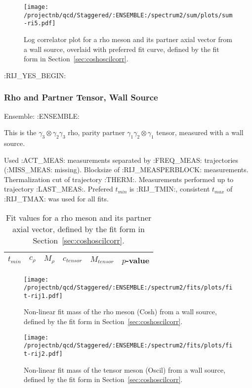 \begin{figure}[H]
\centering
\texttt{[image: /projectnb/qcd/Staggered/:ENSEMBLE:/spectrum2/sum/plots/sum-ri5.pdf]}
\caption{Log correlator plot for a rho meson and its partner axial vector from a wall source, overlaid with preferred fit curve, defined by the fit form in Section~\ref{sec:coshoscilcorr}.}
\end{figure}

\clearpage

:RIJ_YES_BEGIN:
\subsubsection{Rho and Partner Tensor, Wall Source}

Ensemble: :ENSEMBLE:

This is the $\gamma_3 \otimes \gamma_2 \gamma_3$ rho, parity partner $\gamma_1 \gamma_2 \otimes \gamma_1$ tensor, measured with a wall source.

{\small{Used :ACT_MEAS: measurements separated by :FREQ_MEAS: trajectories (:MISS_MEAS: missing). Blocksize of :RIJ_MEASPERBLOCK: measurements. Thermalization cut of trajectory :THERM:. Measurements performed up to trajectory :LAST_MEAS:. Prefered $t_{min}$ is :RIJ_TMIN:, consistent $t_{max}$ of :RIJ_TMAX: was used for all fits.}}


\begin{table}[ht!]
\centering
\scriptsize
\begin{tabular}{|c|c|c|c|c|c|}
\hline
 $t_{min}$ & $c_{\rho}$ &  $M_{\rho}$ & $c_{tensor}$ & $M_{tensor}$ & $p$-value \\
\hline

\end{tabular}
\caption{Fit values for a rho meson and its partner axial vector, defined by the fit form in Section~\ref{sec:coshoscilcorr}.}
\end{table}

\begin{multicols}{2}
\begin{figure}[H]
\centering
\texttt{[image: /projectnb/qcd/Staggered/:ENSEMBLE:/spectrum2/fits/plots/fit-rij1.pdf]}
\caption{Non-linear fit mass of the rho meson (Cosh) from a wall source, defined by the fit form in Section~\ref{sec:coshoscilcorr}.}
\end{figure}
\columnbreak
\begin{figure}[H]
\centering
\texttt{[image: /projectnb/qcd/Staggered/:ENSEMBLE:/spectrum2/fits/plots/fit-rij2.pdf]}
\caption{Non-linear fit mass of the tensor meson (Oscil) from a wall source, defined by the fit form in Section~\ref{sec:coshoscilcorr}.}
\end{figure}
\end{multicols}

